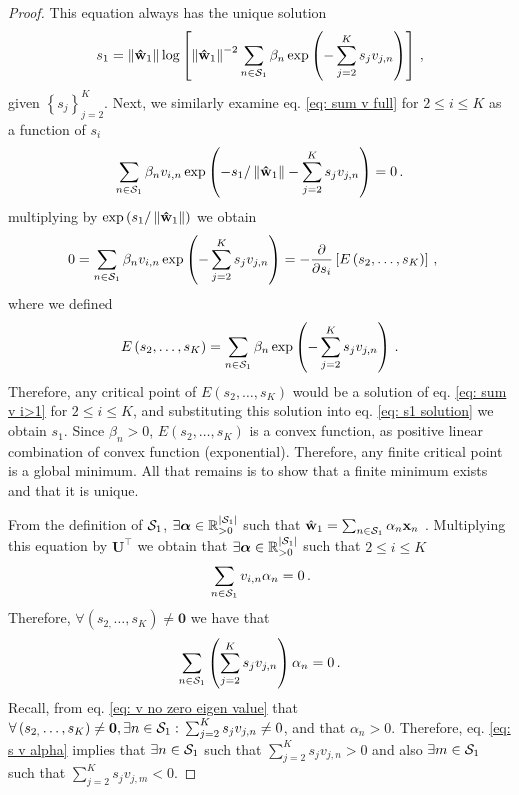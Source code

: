 \documentclass[twoside,11pt,english]{article}
\begin{document}
\begin{proof}
This equation always has the unique solution 
\begin{equation}
s_{1}=\left\Vert \mathbf{\hat{\mathbf{w}}}_{1}\right\Vert \log\left[\left\Vert \mathbf{\hat{\mathbf{w}}}_{1}\right\Vert ^{-2}\sum_{n\in\mathcal{S}_{1}}\beta_{n}\exp\left(-\sum_{j=2}^{K}s_{j}v_{j,n}\right)\right]\,,\label{eq: s1 solution}
\end{equation}
given $\left\{ s_{j}\right\} _{j=2}^{K}$. Next, we similarly examine
eq. \ref{eq: sum v full} for $2\leq i\leq K$ as a function of $s_{i}$
\begin{equation}
\sum_{n\in\mathcal{S}_{1}}\beta_{n}v_{i,n}\exp\left(-s_{1}/\left\Vert \mathbf{\hat{\mathbf{w}}}_{1}\right\Vert -\sum_{j=2}^{K}s_{j}v_{j,n}\right)=0\,.\label{eq: sum v i>1}
\end{equation}
multiplying by $\exp\left(s_{1}/\left\Vert \mathbf{\hat{\mathbf{w}}}_{1}\right\Vert \right)$
we obtain 
\begin{align*}
0 & =\sum_{n\in\mathcal{S}_{1}}\beta_{n}v_{i,n}\exp\left(-\sum_{j=2}^{K}s_{j}v_{j,n}\right)=-\frac{\partial}{\partial s_{i}}\left[E\left(s_{2},\dots,s_{K}\right)\right]\,,
\end{align*}
where we defined 
\[
E\left(s_{2},\dots,s_{K}\right)=\sum_{n\in\mathcal{S}_{1}}\beta_{n}\exp\left(-\sum_{j=2}^{K}s_{j}v_{j,n}\right)\,.
\]
Therefore, any critical point of $E\left(s_{2},\dots,s_{K}\right)$
would be a solution of eq. \ref{eq: sum v i>1} for $2\leq i\leq K$,
and substituting this solution into eq. \ref{eq: s1 solution} we
obtain $s_{1}$. Since $\beta_{n}>0$, $E\left(s_{2},\dots,s_{K}\right)$
is a convex function, as positive linear combination of convex function
(exponential). Therefore, any finite critical point is a global minimum.
All that remains is to show that a finite minimum exists and that
it is unique.

From the definition of $\mathcal{S}_{1}$, $\exists\boldsymbol{\alpha}\in\mathbb{R}_{>0}^{\left|\mathcal{S}_{1}\right|}$
such that $\hat{\mathbf{w}}_{1}=\sum_{n\in\mathcal{S}_{1}}\alpha_{n}\mathbf{x}_{n}$
. Multiplying this equation by $\mathbf{U}^{\top}$ we obtain that
$\exists\boldsymbol{\alpha}\in\mathbb{R}_{>0}^{\left|\mathcal{S}_{1}\right|}$
such that $2\leq i\leq K$ 
\begin{equation}
\,\sum_{n\in\mathcal{S}_{1}}v_{i,n}\alpha_{n}=0\,.\label{eq: alpha existence-1}
\end{equation}
Therefore, $\forall\left(s_{2,}\dots,s_{K}\right)\neq\mathbf{0}$
we have that 
\begin{equation}
\sum_{n\in\mathcal{S}_{1}}\left(\sum_{j=2}^{K}s_{j}v_{j,n}\right)\alpha_{n}=0\,.\label{eq: s v alpha}
\end{equation}
Recall, from eq. \ref{eq: v no zero eigen value} that $\forall\left(s_{2,}\dots,s_{K}\right)\neq\mathbf{0},\exists n\in\mathcal{S}_{1}:\,\sum_{j=2}^{K}s_{j}v_{j,n}\neq0$,
and that $\alpha_{n}>0$. Therefore, eq. \ref{eq: s v alpha} implies
that $\exists n\in\mathcal{S}_{1}$ such that $\sum_{j=2}^{K}s_{j}v_{j,n}>0$
and also $\exists m\in\mathcal{S}_{1}$ such that $\sum_{j=2}^{K}s_{j}v_{j,m}<0$.


\end{proof}
\end{document}
